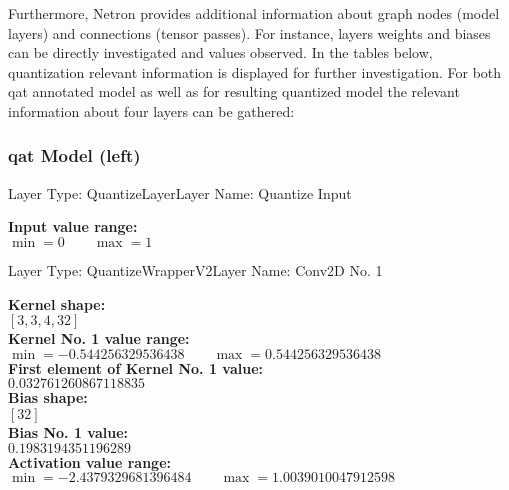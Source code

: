 {Furthermore, Netron provides additional information about graph nodes (model layers) and connections (tensor passes). For instance,
layers weights and biases can be directly investigated and values observed. In the tables below,
quantization relevant information is displayed for further investigation.
For both \gls{qat} annotated model as well as for resulting quantized model the relevant information about four layers can be gathered:

\subsubsection*{\gls{qat} Model (left)}

\begin{layerbox}{Layer Type: QuantizeLayer}{Layer Name: Quantize Input}
  \begin{center}
    \textbf{Input value range:} \\[2pt]
    $\min = 0 \quad\quad \max = 1$
  \end{center}
\end{layerbox}

\begin{layerbox}{Layer Type: QuantizeWrapperV2}{Layer Name: Conv2D No. 1}
  \begin{center}
    \textbf{Kernel shape:} \\[2pt]
    $[3, 3, 4, 32]$ \\[6pt]
    \textbf{Kernel No. 1 value range:} \\[2pt]
    $\min = -0.544256329536438 \quad\quad \max = 0.544256329536438$ \\[6pt]
    \textbf{First element of Kernel No. 1 value:} \\[2pt]
    $0.032761260867118835$ \\[6pt]
    \textbf{Bias shape:} \\[2pt]
    $[32]$ \\[6pt]
    \textbf{Bias No. 1 value:} \\[2pt]
    $0.1983194351196289$ \\[6pt]
    \textbf{Activation value range:} \\[2pt]
    $\min = -2.4379329681396484 \quad\quad \max = 1.0039010047912598$
  \end{center}
\end{layerbox}

}
